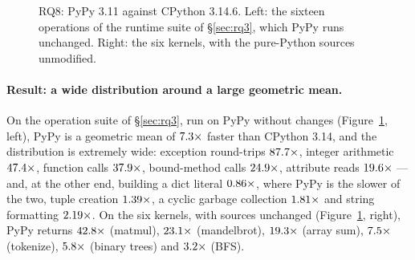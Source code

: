 \begin{figure}[t]
  \centering
  \caption{RQ8: PyPy 3.11 against CPython 3.14.6. Left: the sixteen operations of the runtime
    suite of \S\ref{sec:rq3}, which PyPy runs unchanged. Right: the six kernels, with the
    pure-Python sources unmodified.}
  \label{fig:pypy}
\end{figure}

\paragraph{Result: a wide distribution around a large geometric mean.}
On the operation suite of \S\ref{sec:rq3}, run on PyPy without changes
(Figure~\ref{fig:pypy}, left),
PyPy is a geometric mean of $\meas{geomean:b3_runtime-v314|b3_runtime-pypy311}{7.3}\times$ faster than CPython 3.14, and the distribution is
extremely wide: exception round-trips $\meas{ratio:b3_runtime-v314:exception_roundtrip/v314|b3_runtime-pypy311:exception_roundtrip/pypy311}{87.7}\times$, integer arithmetic $\meas{ratio:b3_runtime-v314:int_arith/v314|b3_runtime-pypy311:int_arith/pypy311}{47.4}\times$, function
calls $\meas{ratio:b3_runtime-v314:func_call/v314|b3_runtime-pypy311:func_call/pypy311}{37.9}\times$, bound-method calls $\meas{ratio:b3_runtime-v314:method_call/v314|b3_runtime-pypy311:method_call/pypy311}{24.9}\times$, attribute reads $\meas{ratio:b3_runtime-v314:attr_get/v314|b3_runtime-pypy311:attr_get/pypy311}{19.6}\times$ --- and, at
the other end, building a dict literal $\meas{ratio:b3_runtime-v314:create_dict/v314|b3_runtime-pypy311:create_dict/pypy311}{0.86}\times$, where PyPy is the slower of the two, tuple
creation $\meas{ratio:b3_runtime-v314:create_tuple/v314|b3_runtime-pypy311:create_tuple/pypy311}{1.39}\times$, a cyclic garbage collection $\meas{ratio:b3_runtime-v314:gc_collect_100k_cycles/v314|b3_runtime-pypy311:gc_collect_100k_cycles/pypy311}{1.81}\times$ and string formatting
$\meas{ratio:b3_runtime-v314:str_format_join/v314|b3_runtime-pypy311:str_format_join/pypy311}{2.19}\times$. On the six kernels, with sources unchanged (Figure~\ref{fig:pypy}, right), PyPy returns
$\meas{ratio:b1_compute-314:matmul/cpython_loop|b1_compute-pypy311:matmul/cpython_loop}{42.8}\times$ (matmul), $\meas{ratio:b1_compute-314:mandelbrot/cpython_loop|b1_compute-pypy311:mandelbrot/cpython_loop}{23.1}\times$ (mandelbrot), $\meas{ratio:b1_compute-314:arraysum/cpython_loop|b1_compute-pypy311:arraysum/cpython_loop}{19.3}\times$ (array sum), $\meas{ratio:b2_branchy-314:tokenize/cpython_loop|b2_branchy-pypy311:tokenize/cpython_loop}{7.5}\times$
(tokenize), $\meas{ratio:b2_branchy-314:binarytrees/cpython_loop|b2_branchy-pypy311:binarytrees/cpython_loop}{5.8}\times$ (binary trees) and $\meas{ratio:b2_branchy-314:bfs/cpython_loop|b2_branchy-pypy311:bfs/cpython_loop}{3.2}\times$ (BFS).

